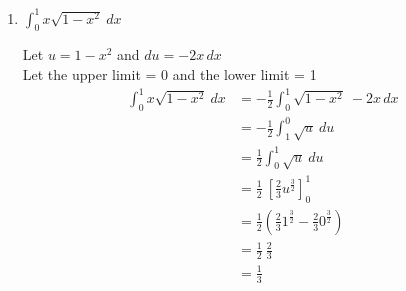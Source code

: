 \documentclass[12pt]{article}
\begin{document}
\begin{enumerate}
\item $\displaystyle\int_0^1x\sqrt{1-x^2} \ dx $

Let $u = 1-x^2$ and $du = -2x\,dx$ \\
Let the upper limit = 0 and the lower limit = 1 
\begin{equation*}
\begin{aligned}
\int_0^1x\sqrt{1-x^2} \ dx  &= -\frac{1}{2} \int_0^1\sqrt{1-x^2} \ -2x\,dx \\
&= -\frac{1}{2} \int_1^0\sqrt{u} \ du \\
&= \frac{1}{2} \int_0^1\sqrt{u} \ du \\
&= \frac{1}{2} \ \left[\frac{2}{3} u^{\frac{3}{2}}\right]_0^1 \\
&= \frac{1}{2} \left(\frac{2}{3} 1^{\frac{3}{2}} - \frac{2}{3} 0^{\frac{3}{2}} \right) \\
&= \frac{1}{2} \ \frac{2}{3} \\
&= \frac{1}{3}
\end{aligned}
\end{equation*}

\end{enumerate}
\end{document}
